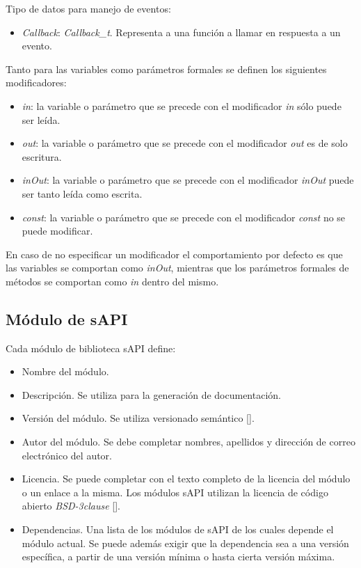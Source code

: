 Tipo de datos para manejo de eventos:

\begin{itemize}
\item
\emph{Callback}: \emph{Callback\_t}. Representa a una función a llamar en respuesta a un evento.
\end{itemize}



Tanto para las variables como parámetros formales se definen los siguientes modificadores:

\begin{itemize}
\item
\emph{in}: la variable o parámetro que se precede con el modificador \emph{in} sólo puede ser leída.
\item
\emph{out}: la variable o parámetro que se precede con el modificador \emph{out} es de solo escritura. 
\item
\emph{inOut}: la variable o parámetro que se precede con el modificador \emph{inOut} puede ser tanto leída como escrita.
\item
\emph{const}: la variable o parámetro que se precede con el modificador \emph{const} no se puede modificar.
\end{itemize}

En caso de no especificar un modificador el comportamiento por defecto es que las variables se comportan como \emph{inOut}, mientras que los parámetros formales de métodos se comportan como \emph{in} dentro del mismo.

\subsection{Módulo de sAPI}

Cada módulo de biblioteca sAPI define:

\begin{itemize}
\item
Nombre del módulo.
\item
Descripción. Se utiliza para la generación de documentación.
\item
Versión del módulo. Se utiliza versionado semántico [].
\item
Autor del módulo. Se debe completar nombres, apellidos y dirección de correo electrónico del autor. 
\item
Licencia. Se puede completar con el texto completo de la licencia del módulo o un enlace a la misma. Los módulos sAPI utilizan la licencia de código abierto \emph{BSD-3clause} [].
\item
Dependencias. Una lista de los módulos de sAPI de los cuales depende el módulo actual. Se puede además exigir que la dependencia sea a una versión específica, a partir de una versión mínima o hasta cierta versión máxima.
\end{itemize}

